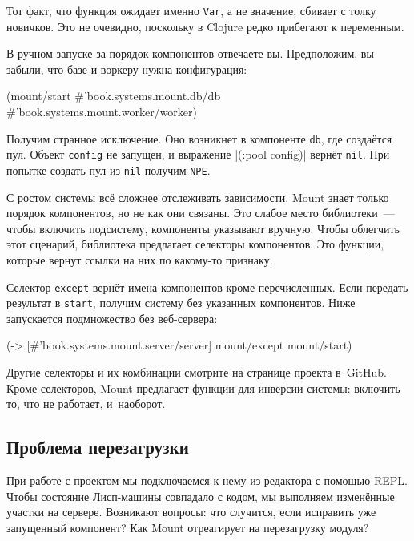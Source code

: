 
Тот факт, что функция ожидает именно \verb|Var|, а не значение, сбивает с толку
новичков. Это не очевидно, поскольку в Clojure редко прибегают к переменным.

В ручном запуске за порядок компонентов отвечаете вы. Предположим, вы забыли,
что базе и воркеру нужна конфигурация:

\begin{english}
  \begin{clojure}
(mount/start
  #'book.systems.mount.db/db
  #'book.systems.mount.worker/worker)
  \end{clojure}
\end{english}

Получим странное исключение. Оно возникнет в компоненте \verb|db|, где создаётся
пул. Объект \verb|config| не запущен, и выражение \spverb|(:pool config)| вернёт
\verb|nil|. При попытке создать пул из \verb|nil| получим \verb|NPE|.

С ростом системы всё сложнее отслеживать зависимости. Mount знает только порядок
компонентов, но не как они связаны. Это слабое место библиотеки~--- чтобы
включить подсистему, компоненты указывают вручную. Чтобы облегчить этот
сценарий, библиотека предлагает селекторы компонентов. Это функции, которые
вернут ссылки на них по какому-то признаку.

Селектор \verb|except| вернёт имена компонентов кроме перечисленных. Если
передать результат в \verb|start|, получим систему без указанных
компонентов. Ниже запускается подмножество без веб-сервера:

\begin{english}
  \begin{clojure}
(-> [#'book.systems.mount.server/server]
    mount/except
    mount/start)
  \end{clojure}
\end{english}

Другие селекторы и их комбинации смотрите на странице проекта в~GitHub. Кроме
селекторов, Mount предлагает функции для инверсии системы: включить то, что не
работает, и~наоборот.

\subsection{Проблема перезагрузки}

При работе с проектом мы подключаемся к нему из редактора с помощью REPL. Чтобы
состояние Лисп-машины совпадало с кодом, мы выполняем изменённые участки на
сервере. Возникают вопросы: что случится, если исправить уже запущенный
компонент? Как Mount отреагирует на перезагрузку модуля?

